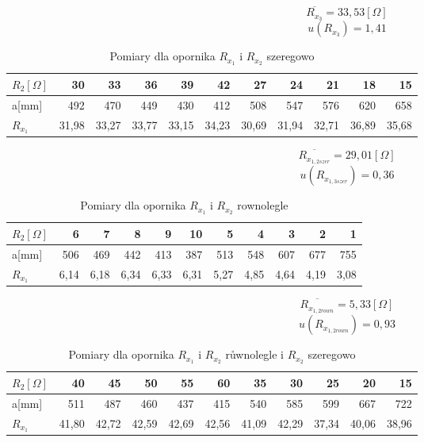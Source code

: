 \documentclass[a4paper,10pt,twoside]{article}
\begin{document}
$$\overline{R_{x_3}}=33,53 [\Omega]$$
$$u(R_{x_3})=1,41$$
\begin{table}
	\centering
	\begin{tabular}{|l|r|r|r|r|r|r|r|r|r|r|}
		\hline
		$R_2[\Omega]$  & 30    & 33   & 36    & 39    & 42   & 27   & 24    & 21     & 18     & 15   \\
		\hline
		a[mm]  & 492   & 470  & 449 & 430   & 412  & 508  & 547  & 576   & 620   & 658   \\
		\hline
		$R_{x_1}$ & 31,98 & 33,27 & 33,77 & 33,15 & 34,23 & 30,69 & 31,94 & 32,71 & 36,89 & 35,68\\
		\hline                      
	\end{tabular}
	\caption{Pomiary dla opornika $R_{x_1}$ i $R_{x_2}$ szeregowo}
	\label{tab:Rx1}
\end{table}
$$\overline{R_{x_{1,2szer}}}=29,01 [\Omega]$$
$$u(R_{x_{1,3szer}})=0,36$$
\begin{table}
	\centering
	\begin{tabular}{|l|r|r|r|r|r|r|r|r|r|r|}
		\hline
		$R_2[\Omega]$  & 6  & 7    & 8     & 9     & 10   & 5    & 4     & 3      & 2      & 1    \\
		\hline
		a[mm]  & 506   & 469  & 442 & 413   & 387  & 513  & 548  & 607   & 677   & 755   \\
		\hline
		$R_{x_1}$ & 6,14  & 6,18  & 6,34  & 6,33  & 6,31  & 5,27  & 4,85  & 4,64  & 4,19  & 3,08 \\
		\hline                      
	\end{tabular}
	\caption{Pomiary dla opornika  $R_{x_1}$ i $R_{x_2}$ rownolegle}
	\label{tab:Rx1}
\end{table}
$$\overline{R_{x_{1,2rown}}}=5,33 [\Omega]$$
$$u(R_{x_{1,2rown}})=0,93$$
	\begin{table}
		\centering
		\begin{tabular}{|l|r|r|r|r|r|r|r|r|r|r|}
			\hline
			$R_2[\Omega]$  & 40 & 45   & 50    & 55    & 60   & 35   & 30    & 25     & 20     & 15   \\
			\hline
			a[mm]  & 511   & 487  & 460& 437   & 415  & 540  & 585  & 599   & 667   & 722   \\
			\hline
			$R_{x_1}$ & 41,80& 42,72 & 42,59 & 42,69 & 42,56 & 41,09 & 42,29 & 37,34 & 40,06 & 38,96\\
			\hline                      
		\end{tabular}
		\caption{Pomiary dla opornika $R_{x_1}$ i $R_{x_2}$ růwnolegle i $R_{x_2}$ szeregowo}
		\label{tab:Rx1}
	\end{table}
\end{document}
